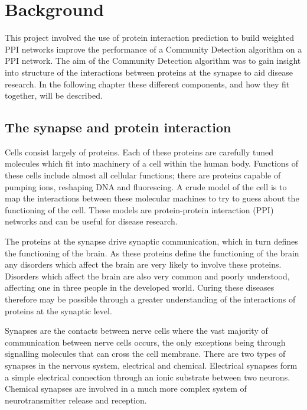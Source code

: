 \chapter{Background}
\label{background}

This project involved the use of protein interaction prediction to build weighted PPI networks improve the performance of a Community Detection algorithm on a PPI network.
The aim of the Community Detection algorithm was to gain insight into structure of the interactions between proteins at the synapse to aid disease research.
In the following chapter these different components, and how they fit together, will be described.

\section{The synapse and protein interaction}

Cells consist largely of proteins.
Each of these proteins are carefully tuned molecules which fit into machinery of a cell within the human body.
Functions of these cells include almost all cellular functions; there are proteins capable of pumping ions, reshaping DNA and fluorescing\autocite{alberts_molecular_2008}.
A crude model of the cell is to map the interactions between these molecular machines to try to guess about the functioning of the cell.
These models are protein-protein interaction (PPI) networks and can be useful for disease research.

The proteins at the synapse drive synaptic communication, which in turn defines the functioning of the brain.
As these proteins define the functioning of the brain any disorders which affect the brain are very likely to involve these proteins.
Disorders which affect the brain are also very common and poorly understood, affecting one in three people in the developed world.
Curing these diseases therefore may be possible through a greater understanding of the interactions of proteins at the synaptic level\autocites{synsys,chua_architecture_2010}.

Synapses are the contacts between nerve cells where the vast majority of communication between nerve cells occurs, the only exceptions being through signalling molecules that can cross the cell membrane.
There are two types of synapses in the nervous system, electrical and chemical\autocite{kandel_principles_2000}.
Electrical synapses form a simple electrical connection through an ionic substrate between two neurons.
Chemical synapses are involved in a much more complex system of neurotransmitter release and reception.


